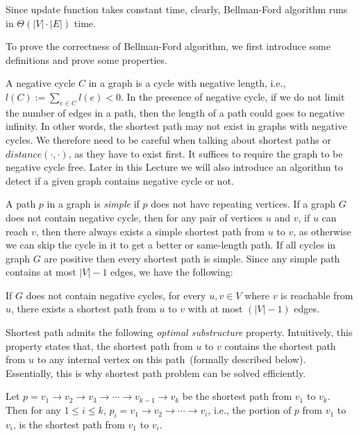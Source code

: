 Since update function takes constant time, clearly, Bellman-Ford algorithm runs in $\Theta(|V| \cdot |E|)$ time.

To prove the correctness of Bellman-Ford algorithm,
we first introduce some definitions and prove some properties.

A negative cycle $C$ in a graph is a cycle with negative length, i.e., $l(C) := \sum_{e\in C} l(e) < 0$.
In the presence of negative cycle, if we do not limit the number of edges
in a path, then the length of a path could goes to negative infinity.
In other words, the shortest path may not exist in graphs with negative cycles.
We therefore need to be careful when talking about shortest paths or $distance(\cdot, \cdot)$,
as they have to exist first. It suffices to require the graph to be negative cycle free.
Later in this Lecture we will
also introduce an algorithm to detect if a given graph contains negative cycle or not.

A path $p$ in a graph is \emph{simple} if $p$ does not have repeating vertices.
If a graph $G$ does not contain negative cycle, then 
for any pair of vertices $u$ and $v$, if $u$ can reach $v$,
then there always exists a {simple} shortest path from $u$ to $v$,
as otherwise we can skip the cycle in it to get a better or same-length path.
If all cycles in graph $G$ are positive then every shortest path is simple.
Since any simple path contains at most $|V| - 1$ edges, we have the following:

\begin{fact}
If $G$ does not contain negative cycles, for every $u,v\in V$ where $v$ is reachable from $u$, 
there exists a shortest path from $u$ to $v$ with at most $(|V| - 1)$ edges.
\end{fact}

Shortest path admits the following \emph{optimal substructure} property.
Intuitively, this property states that, the shortest path from $u$ to $v$
contains the shortest path from $u$ to any internal vertex on this path~(formally described below).
Essentially, this is why shortest path problem can be solved efficiently.

\begin{fact}
Let $p = v_1 \to v_2 \to v_3 \to \cdots \to v_{k-1} \to v_k$
be the shortest path from $v_1$ to $v_k$.
Then for any $1\le i \le k$,
$p_i = v_1 \to v_2 \to \cdots \to  v_i$,
i.e., the portion of $p$ from $v_1$ to $v_i$,
is the shortest path from $v_1$ to $v_i$.
\end{fact}

